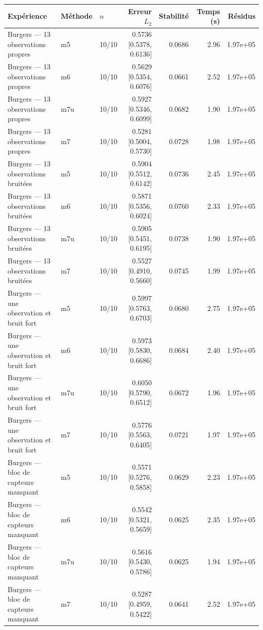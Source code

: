\begin{tabular}{lllrrrr}
\toprule
Expérience & Méthode & $n$ & Erreur $L_2$ & Stabilité & Temps (s) & Résidus \\
\midrule
Burgers — 13 observations propres & m5 & 10/10 & 0.5736 [0.5378, 0.6136] & 0.0686 & 2.96 & 1.97e+05 \\
Burgers — 13 observations propres & m6 & 10/10 & 0.5629 [0.5354, 0.6076] & 0.0661 & 2.52 & 1.97e+05 \\
Burgers — 13 observations propres & m7u & 10/10 & 0.5927 [0.5346, 0.6099] & 0.0682 & 1.90 & 1.97e+05 \\
Burgers — 13 observations propres & m7 & 10/10 & 0.5281 [0.5004, 0.5730] & 0.0728 & 1.98 & 1.97e+05 \\
Burgers — 13 observations bruitées & m5 & 10/10 & 0.5904 [0.5512, 0.6142] & 0.0736 & 2.45 & 1.97e+05 \\
Burgers — 13 observations bruitées & m6 & 10/10 & 0.5871 [0.5356, 0.6024] & 0.0760 & 2.33 & 1.97e+05 \\
Burgers — 13 observations bruitées & m7u & 10/10 & 0.5905 [0.5451, 0.6195] & 0.0738 & 1.90 & 1.97e+05 \\
Burgers — 13 observations bruitées & m7 & 10/10 & 0.5527 [0.4910, 0.5660] & 0.0745 & 1.99 & 1.97e+05 \\
Burgers — une observation et bruit fort & m5 & 10/10 & 0.5997 [0.5763, 0.6703] & 0.0680 & 2.75 & 1.97e+05 \\
Burgers — une observation et bruit fort & m6 & 10/10 & 0.5973 [0.5830, 0.6686] & 0.0684 & 2.40 & 1.97e+05 \\
Burgers — une observation et bruit fort & m7u & 10/10 & 0.6050 [0.5790, 0.6512] & 0.0672 & 1.96 & 1.97e+05 \\
Burgers — une observation et bruit fort & m7 & 10/10 & 0.5776 [0.5563, 0.6405] & 0.0721 & 1.97 & 1.97e+05 \\
Burgers — bloc de capteurs manquant & m5 & 10/10 & 0.5571 [0.5276, 0.5858] & 0.0629 & 2.23 & 1.97e+05 \\
Burgers — bloc de capteurs manquant & m6 & 10/10 & 0.5542 [0.5321, 0.5659] & 0.0625 & 2.35 & 1.97e+05 \\
Burgers — bloc de capteurs manquant & m7u & 10/10 & 0.5616 [0.5430, 0.5786] & 0.0625 & 1.94 & 1.97e+05 \\
Burgers — bloc de capteurs manquant & m7 & 10/10 & 0.5287 [0.4959, 0.5422] & 0.0641 & 2.52 & 1.97e+05 \\
\bottomrule
\end{tabular}
